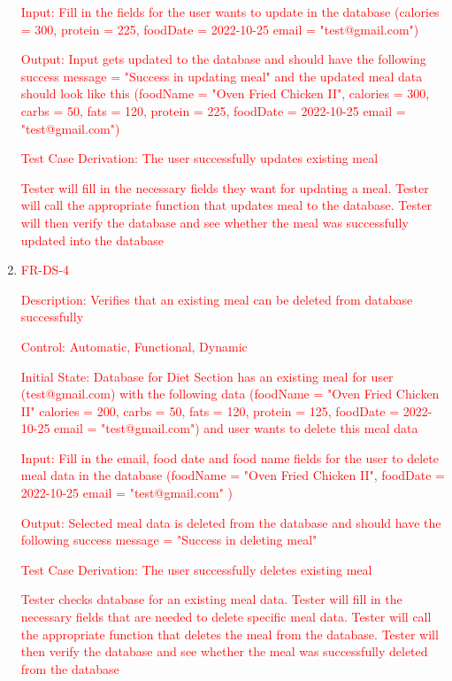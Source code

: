 \documentclass[12pt, titlepage]{article}
\begin{document}
\begin{enumerate}
	\textcolor{red}{Input: Fill in the fields for the user wants to update in the database (calories = 300, protein = 225, foodDate = 2022-10-25 email = "test@gmail.com")}
	
	\textcolor{red}{Output: Input gets updated to the database and should have the following success message = "Success in updating meal" and the updated meal data should look like this (foodName = "Oven Fried Chicken II", calories = 300, carbs = 50, fats = 120, protein = 225, foodDate = 2022-10-25 email = "test@gmail.com")}
	
	\textcolor{red}{Test Case Derivation: The user successfully updates existing meal}
	
	\textcolor{red}{Tester will fill in the necessary fields they want for updating a meal. Tester will call the appropriate function that updates meal to the database. Tester will then verify the database and see whether the meal was successfully updated into the database}

  \item{\textcolor{red}{FR-DS-4\\}}

 \textcolor{red}{Description: Verifies that an existing meal can be deleted from database successfully}
	
	\textcolor{red}{Control: Automatic, Functional, Dynamic}
	
	\textcolor{red}{Initial State: Database for Diet Section has an existing meal for user (test@gmail.com) with the following data (foodName = "Oven Fried Chicken II" calories = 200, carbs = 50, fats = 120, protein = 125, foodDate = 2022-10-25 email = "test@gmail.com") and user wants to delete this meal data}
	
	\textcolor{red}{Input: Fill in the email, food date and food name fields for the user to delete meal data in the database (foodName = "Oven Fried Chicken II", foodDate = 2022-10-25 email = "test@gmail.com" )}
	
	\textcolor{red}{Output: Selected meal data is deleted from the database and should have the following success message = "Success in deleting meal"}
	
	\textcolor{red}{Test Case Derivation: The user successfully deletes existing meal}
	
	\textcolor{red}{Tester checks database for an existing meal data. Tester will fill in the necessary fields that are needed to delete specific meal data. Tester will call the appropriate function that deletes the meal from the database. Tester will then verify the database and see whether the meal was successfully deleted from the database}


\end{enumerate}
\end{document}
